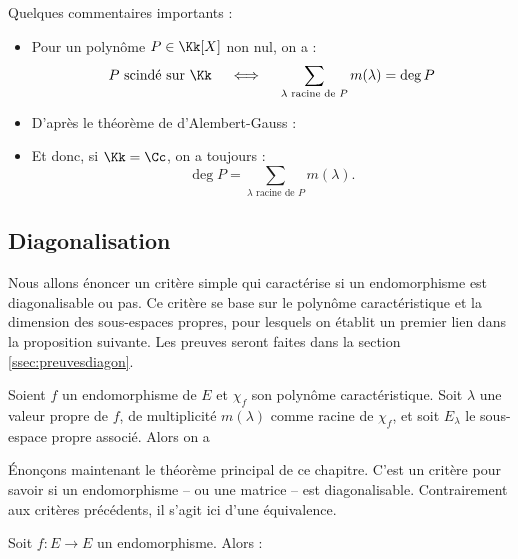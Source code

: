 \documentclass[12pt, class=report,crop=false]{standalone}
\begin{document}
\bigskip

Quelques commentaires importants :
\begin{itemize}  
\item Pour un polynôme $P \in \Kk[X]$ non nul, on a :
\[P \text{ scindé sur } \Kk \quad \iff \quad \sum_{\lambda \text{ racine de } P} m(\lambda) = \deg P\]

  \item D'après le théorème de d'Alembert-Gauss :

  \item Et donc, si $\Kk = \Cc$, on a toujours :
  \[\deg P = \sum_{\lambda \text{ racine de } P} m(\lambda).\]
  
\end{itemize}


\subsection{Diagonalisation}
\label{ssec:diagon}

Nous allons énoncer un critère simple qui caractérise si un endomorphisme est diagonalisable ou pas. Ce critère se base sur le polynôme caractéristique et la dimension des sous-espaces propres, pour lesquels on établit un premier lien dans la proposition suivante. Les preuves seront faites dans la section \ref{ssec:preuvesdiagon}.

\begin{proposition}
\label{prop:dimElambda}
Soient $f$ un endomorphisme de $E$ et $\chi_f$ son polynôme caractéristique.
Soit $\lambda$ une valeur propre de $f$, de multiplicité $m(\lambda)$  comme racine de $\chi_f$, et soit $E_\lambda$ le sous-espace propre associé. Alors on a
\end{proposition} 


\'Enonçons maintenant le théorème principal de ce chapitre. C'est un critère pour savoir si un endomorphisme -- ou une matrice -- est diagonalisable. Contrairement aux critères précédents, il s'agit ici d'une équivalence.


\begin{theoreme}
\label{th:diagon}
Soit $f :  E \to E$ un endomorphisme. Alors :
\end{theoreme}
\end{document}
